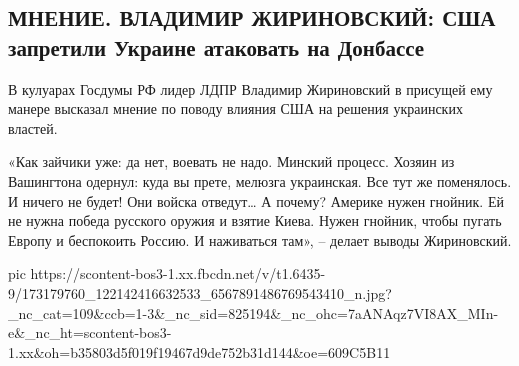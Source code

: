  
 
 
 
 
\subsection{МНЕНИЕ. ВЛАДИМИР ЖИРИНОВСКИЙ:  США запретили Украине атаковать на Донбассе}
\label{sec:14_04_2021.fb.respublikalnr.1.zhirik}

В кулуарах Госдумы РФ лидер ЛДПР Владимир Жириновский в присущей ему манере
высказал мнение по поводу влияния США на решения украинских властей.

«Как зайчики уже: да нет, воевать не надо. Минский процесс. Хозяин из
Вашингтона одернул: куда вы прете, мелюзга украинская. Все тут же поменялось. И
ничего не будет! Они войска отведут… А почему? Америке нужен гнойник. Ей не
нужна победа русского оружия и взятие Киева. Нужен гнойник, чтобы пугать Европу
и беспокоить Россию. И наживаться там», – делает выводы Жириновский.

\ifcmt
  pic https://scontent-bos3-1.xx.fbcdn.net/v/t1.6435-9/173179760_122142416632533_6567891486769543410_n.jpg?_nc_cat=109&ccb=1-3&_nc_sid=825194&_nc_ohc=7aANAqz7VI8AX_MIn-e&_nc_ht=scontent-bos3-1.xx&oh=b35803d5f019f19467d9de752b31d144&oe=609C5B11
\fi

